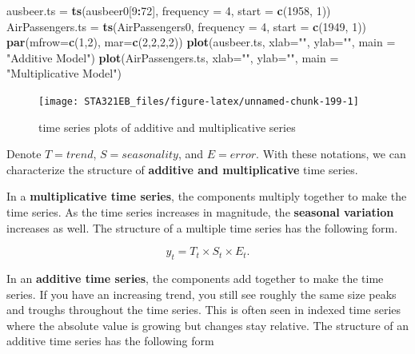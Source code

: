 \documentclass[
]{book}
\newenvironment{Shaded}{\begin{snugshade}}{\end{snugshade}}
\newcommand{\AttributeTok}[1]{\textcolor[rgb]{0.13,0.29,0.53}{#1}}
\newcommand{\DecValTok}[1]{\textcolor[rgb]{0.00,0.00,0.81}{#1}}
\newcommand{\FunctionTok}[1]{\textcolor[rgb]{0.13,0.29,0.53}{\textbf{#1}}}
\newcommand{\NormalTok}[1]{#1}
\newcommand{\OtherTok}[1]{\textcolor[rgb]{0.56,0.35,0.01}{#1}}
\newcommand{\SpecialCharTok}[1]{\textcolor[rgb]{0.81,0.36,0.00}{\textbf{#1}}}
\newcommand{\StringTok}[1]{\textcolor[rgb]{0.31,0.60,0.02}{#1}}
\begin{document}
\begin{Shaded}
\begin{Highlighting}[]
\NormalTok{ausbeer.ts }\OtherTok{=} \FunctionTok{ts}\NormalTok{(ausbeer0[}\DecValTok{9}\SpecialCharTok{:}\DecValTok{72}\NormalTok{], }\AttributeTok{frequency =} \DecValTok{4}\NormalTok{, }\AttributeTok{start =} \FunctionTok{c}\NormalTok{(}\DecValTok{1958}\NormalTok{, }\DecValTok{1}\NormalTok{))}
\NormalTok{AirPassengers.ts }\OtherTok{=} \FunctionTok{ts}\NormalTok{(AirPassengers0, }\AttributeTok{frequency =} \DecValTok{4}\NormalTok{, }\AttributeTok{start =} \FunctionTok{c}\NormalTok{(}\DecValTok{1949}\NormalTok{, }\DecValTok{1}\NormalTok{))}
\FunctionTok{par}\NormalTok{(}\AttributeTok{mfrow=}\FunctionTok{c}\NormalTok{(}\DecValTok{1}\NormalTok{,}\DecValTok{2}\NormalTok{), }\AttributeTok{mar=}\FunctionTok{c}\NormalTok{(}\DecValTok{2}\NormalTok{,}\DecValTok{2}\NormalTok{,}\DecValTok{2}\NormalTok{,}\DecValTok{2}\NormalTok{))}
\FunctionTok{plot}\NormalTok{(ausbeer.ts, }\AttributeTok{xlab=}\StringTok{""}\NormalTok{, }\AttributeTok{ylab=}\StringTok{""}\NormalTok{, }\AttributeTok{main =} \StringTok{"Additive Model"}\NormalTok{)}
\FunctionTok{plot}\NormalTok{(AirPassengers.ts, }\AttributeTok{xlab=}\StringTok{""}\NormalTok{, }\AttributeTok{ylab=}\StringTok{""}\NormalTok{, }\AttributeTok{main =} \StringTok{"Multiplicative Model"}\NormalTok{)}
\end{Highlighting}
\end{Shaded}

\begin{figure}

{\centering \texttt{[image: STA321EB\_files/figure-latex/unnamed-chunk-199-1]} 

}

\caption{time series plots of additive and multiplicative series}\label{fig:unnamed-chunk-199}
\end{figure}

Denote \(T = trend\), \(S = seasonality\), and \(E = error\). With these notations, we can characterize the structure of \textbf{additive and multiplicative} time series.

In a \textbf{multiplicative time series}, the components multiply together to make the time series. As the time series increases in magnitude, the \textbf{seasonal variation} increases as well. The structure of a multiple time series has the following form.

\[
y_t = T_t \times S_t \times E_t.
\]

In an \textbf{additive time series}, the components add together to make the time series. If you have an increasing trend, you still see roughly the same size peaks and troughs throughout the time series. This is often seen in indexed time series where the absolute value is growing but changes stay relative. The structure of an additive time series has the following form
\end{document}
